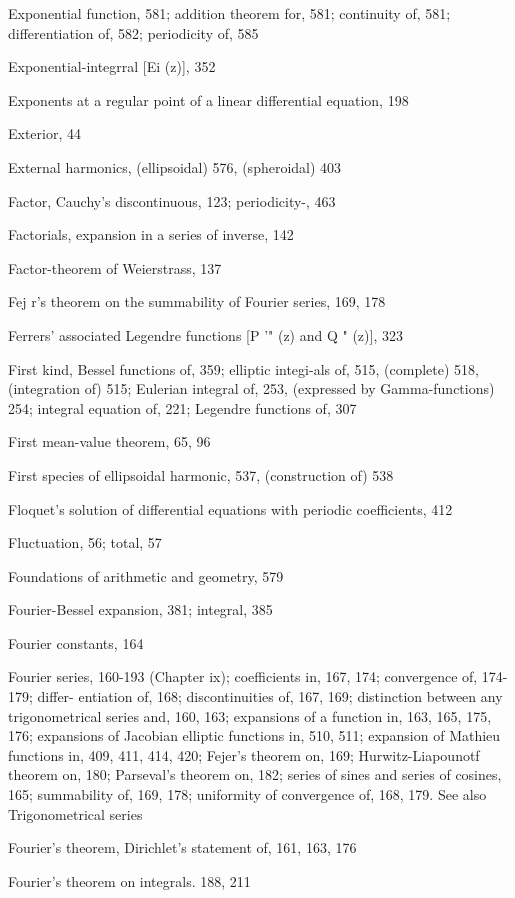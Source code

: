 Exponential function, 581; addition theorem for, 581; continuity of, 581; differentiation of,
582; periodicity of, 585

Exponential-integrral [Ei (z)], 352

Exponents at a regular point of a linear differential equation, 198

Exterior, 44

External harmonics, (ellipsoidal) 576, (spheroidal) 403

Factor, Cauchy's discontinuous, 123; periodicity-, 463

Factorials, expansion in a series of inverse, 142

Factor-theorem of Weierstrass, 137

Fej r's theorem on the summability of Fourier series, 169, 178

Ferrers' associated Legendre functions [P '" (z) and Q "  (z)], 323

First kind, Bessel functions of, 359; elliptic integi-als of, 515, (complete) 518, (integration of)
515; Eulerian integral of, 253, (expressed by Gamma-functions) 254; integral equation of,
221; Legendre functions of, 307

First mean-value theorem, 65, 96

First species of ellipsoidal harmonic, 537, (construction of) 538

Floquet's solution of differential equations with periodic coefficients, 412

Fluctuation, 56; total, 57

Foundations of arithmetic and geometry, 579

Fourier-Bessel expansion, 381; integral, 385

Fourier constants, 164

Fourier series, 160-193 (Chapter ix); coefficients in, 167, 174; convergence of, 174-179; differ-
entiation of, 168; discontinuities of, 167, 169; distinction between any trigonometrical
series and, 160, 163; expansions of a function in, 163, 165, 175, 176; expansions of Jacobian
elliptic functions in, 510, 511; expansion of Mathieu functions in, 409, 411, 414, 420; Fejer's
theorem on, 169; Hurwitz-Liapounotf theorem on, 180; Parseval's theorem on, 182; series
of sines and series of cosines, 165; summability of, 169, 178; uniformity of convergence of,
168, 179. See also Trigonometrical series

Fourier's theorem, Dirichlet's statement of, 161, 163, 176

%
%
Fourier's theorem on integrals. 188, 211

